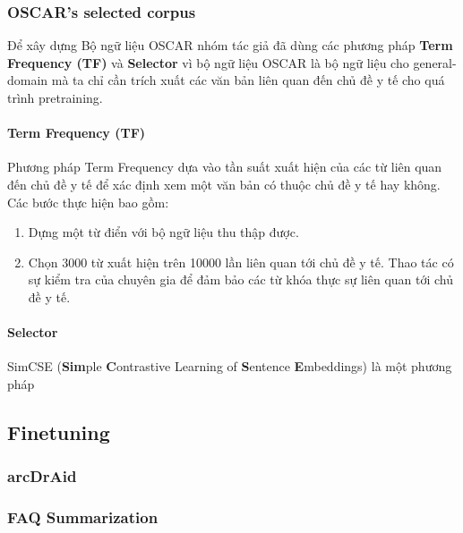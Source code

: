 \subsubsection{OSCAR's selected corpus}
Để xây dựng Bộ ngữ liệu OSCAR\cite{ortiz-suarez-etal-2020-monolingual} nhóm tác giả đã dùng các phương pháp \textbf{Term Frequency (TF)} và \textbf{Selector} vì bộ ngữ liệu OSCAR là bộ ngữ liệu cho general-domain mà ta chỉ cần trích xuất các văn bản liên quan đến chủ đề y tế cho quá trình pretraining.

\paragraph{Term Frequency (TF)}
Phương pháp Term Frequency dựa vào tần suất xuất hiện của các từ liên quan đến chủ đề y tế để xác định xem một văn bản có thuộc chủ đề y tế hay không. Các bước thực hiện bao gồm:
\begin{enumerate}
\item Dựng một từ điển với bộ ngữ liệu thu thập được.
\item Chọn 3000 từ xuất hiện trên 10000 lần liên quan tới chủ đề y tế. Thao tác có sự kiểm tra của chuyên gia để đảm bảo các từ khóa thực sự liên quan tới chủ đề y tế.
\end{enumerate}

\paragraph{Selector}
SimCSE (\textbf{Sim}ple \textbf{C}ontrastive Learning of \textbf{S}entence \textbf{E}mbeddings)\cite{simcse2021} là một phương pháp 

\subsection{Finetuning}
\subsubsection{arcDrAid}

\subsubsection{FAQ Summarization}